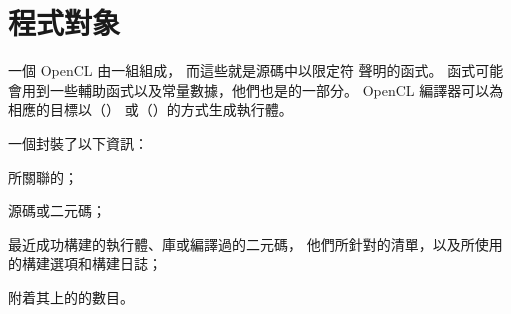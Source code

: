 \section{程式對象}

一個 OpenCL 由一組組成，
而這些就是源碼中以限定符  聲明的函式。
 函式可能會用到一些輔助函式以及常量數據，他們也是的一部分。
OpenCL 編譯器可以為相應的目標以{}（{}）
或{}（{}）的方式生成執行體。

一個封裝了以下資訊：
\startigBase
\item 所關聯的；
\item {}源碼或二元碼；
\item 最近成功構建的執行體、庫或編譯過的二元碼，
他們所針對的清單，以及所使用的構建選項和構建日誌；
\item 附着其上的的數目。
\stopigBase








